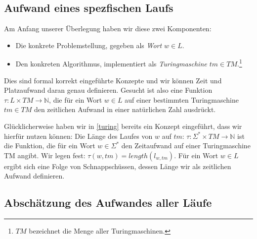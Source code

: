 \subsection{Aufwand eines spezfischen Laufs}
Am Anfang unserer Überlegung haben wir diese zwei Komponenten:
\begin{itemize}
    \item Die konkrete Problemstellung, gegeben als \emph{Wort $w \in L$}.
    \item Den konkreten Algorithmus,
        implementiert als \emph{Turingmaschine $tm \in TM$}.\footnote{
            $TM$ bezeichnet die Menge aller Turingmaschinen.}
\end{itemize}
Dies sind formal korrekt eingeführte Konzepte
und wir können Zeit und Platzaufwand daran genau definieren.
Gesucht ist also eine Funktion $\tau: L \times TM \rightarrow \mathbb{N}$,
die für ein Wort $w \in L$ auf einer bestimmten Turingmaschine $tm \in TM$
den zeitlichen Aufwand in einer natürlichen Zahl ausdrückt.

Glücklicherweise haben wir in \autoref{turing} bereits ein Konzept eingeführt,
dass wir hierfür nutzen können:
Die Länge des Laufes von $w$ auf $tm$:
$\tau: \Sigma^* \times TM \rightarrow \mathbb{N}$ ist die Funktion,
die für ein Wort $w \in \Sigma^*$ den Zeitaufwand auf einer Turingmaschine TM angibt.
Wir legen fest: $\tau(w,tm) =  length(l_{w,tm})$.
Für ein Wort $w \in L$ ergibt sich eine Folge von Schnappschüssen,
dessen Länge wir als zeitlichen Aufwand definieren.



\subsection{Abschätzung des Aufwandes aller Läufe}

